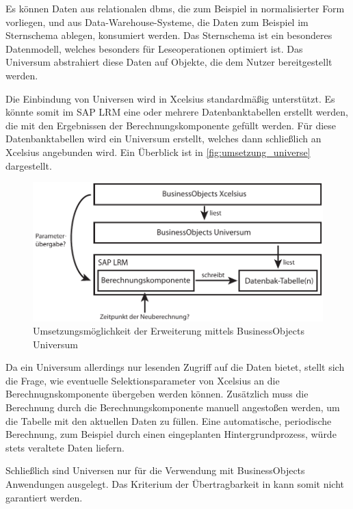 \begin{onehalfspacing}
Es können Daten aus relationalen \gls{dbms}, die zum Beispiel in normalisierter Form vorliegen, und aus Data-Warehouse-Systeme, die Daten zum Beispiel im Sternschema ablegen, konsumiert werden. Das Sternschema ist ein besonderes Datenmodell, welches besonders für Leseoperationen optimiert ist. Das Universum abstrahiert diese Daten auf Objekte, die dem Nutzer bereitgestellt werden.

Die Einbindung von Universen wird in \gls{Xcelsius} standardmäßig unterstützt. Es könnte somit im SAP LRM eine oder mehrere Datenbanktabellen erstellt werden, die mit den Ergebnissen der Berechnungskomponente gefüllt werden. Für diese Datenbanktabellen wird ein Universum erstellt, welches dann schließlich an \gls{Xcelsius} angebunden wird. Ein Überblick ist in \vref{fig:umsetzung_universe} dargestellt.

\begin{figure}[!ht]
\centering
\setlength{\unitlength}{1mm}
\includegraphics[width=15cm]{images/Abbildung9-Umsetzung-Universum.pdf}
\caption{Umsetzungsmöglichkeit der Erweiterung mittels BusinessObjects Universum \label{fig:umsetzung_universe}}
\end{figure}

Da ein Universum allerdings nur lesenden Zugriff auf die Daten bietet, stellt sich die Frage, wie eventuelle Selektionsparameter von \gls{Xcelsius} an die Berechnugnskomponente übergeben werden können. Zusätzlich muss die Berechnung durch die Berechnungskomponente manuell angestoßen werden, um die Tabelle mit den aktuellen Daten zu füllen. Eine automatische, periodische Berechnung, zum Beispiel durch einen eingeplanten Hintergrundprozess, würde stets veraltete Daten liefern.

Schließlich sind Universen nur für die Verwendung mit BusinessObjects Anwendungen ausgelegt. Das Kriterium der Übertragbarkeit in  kann somit nicht garantiert werden.


\end{onehalfspacing}
